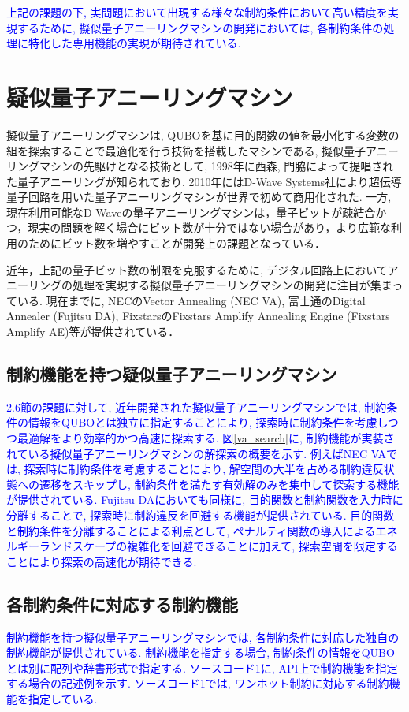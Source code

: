 \documentclass[submit,techrep,noauthor]{ipsj}
\begin{document}
\textcolor{blue}{上記の課題の下, 実問題において出現する様々な制約条件において高い精度を実現するために, 擬似量子アニーリングマシンの開発においては, 各制約条件の処理に特化した専用機能の実現が期待されている.}

\section{疑似量子アニーリングマシン}
擬似量子アニーリングマシンは, QUBOを基に目的関数の値を最小化する変数の組を探索することで最適化を行う技術を搭載したマシンである, 擬似量子アニーリングマシンの先駆けとなる技術として, 1998年に西森, 門脇によって提唱された量子アニーリング\cite{nishimori}が知られており, 2010年にはD-Wave Systems社により超伝導量子回路を用いた量子アニーリングマシンが世界で初めて商用化された\cite{d-wave}. 一方, 現在利用可能なD-Waveの量子アニーリングマシンは，量子ビットが疎結合かつ，現実の問題を解く場合にビット数が十分ではない場合があり，より広範な利用のためにビット数を増やすことが開発上の課題となっている．

近年，上記の量子ビット数の制限を克服するために, デジタル回路上においてアニーリングの処理を実現する擬似量子アニーリングマシンの開発に注目が集まっている. 現在までに, NECのVector Annealing (NEC VA)\cite{va}, 富士通のDigital Annealer (Fujitsu DA)\cite{da}, FixstarsのFixstars Amplify Annealing Engine (Fixstars Amplify AE)\cite{amplify}等が提供されている．

\subsection{制約機能を持つ疑似量子アニーリングマシン}
\textcolor{blue}{2.6節の課題に対して, 近年開発された擬似量子アニーリングマシンでは, 制約条件の情報をQUBOとは独立に指定することにより, 探索時に制約条件を考慮しつつ最適解をより効率的かつ高速に探索する. 図\ref{va_search}に, 制約機能が実装されている擬似量子アニーリングマシンの解探索の概要を示す. 例えばNEC VAでは, 探索時に制約条件を考慮することにより, 解空間の大半を占める制約違反状態への遷移をスキップし, 制約条件を満たす有効解のみを集中して探索する機能が提供されている. Fujitsu DAにおいても同様に, 目的関数と制約関数を入力時に分離することで, 探索時に制約違反を回避する機能が提供されている. 目的関数と制約条件を分離することによる利点として, ペナルティ関数の導入によるエネルギーランドスケープの複雑化を回避できることに加えて, 探索空間を限定することにより探索の高速化が期待できる.}

\subsection{各制約条件に対応する制約機能}
\textcolor{blue}{制約機能を持つ擬似量子アニーリングマシンでは, 各制約条件に対応した独自の制約機能が提供されている. 制約機能を指定する場合, 制約条件の情報をQUBOとは別に配列や辞書形式で指定する. ソースコード1に, API上で制約機能を指定する場合の記述例を示す. ソースコード1では, ワンホット制約に対応する制約機能を指定している.}
\end{document}
